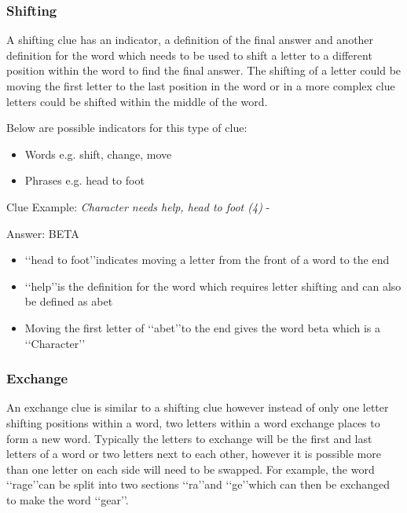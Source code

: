 \subsubsection{Shifting}

A shifting clue has an indicator, a definition of the final answer and another definition for the word which needs to be used to shift a letter to a different position within the word to find the final answer. The shifting of a letter could be moving the first letter to the last position in the word or in a more complex clue letters could be shifted within the middle of the word.  

Below are possible indicators for this type of clue:
\begin{itemize} 
	\item Words e.g. shift, change, move 
	\item Phrases e.g. head to foot 
\\
\end{itemize}

Clue Example: \emph{Character needs help, head to foot (4)}  - \citep{shuchiShifting09} 

Answer: BETA 

\begin{itemize}
	\item \lq\lq head to foot\rq\rq indicates moving a letter from the front of a word to the end 
	\item \lq\lq help\rq\rq is the definition for the word which requires letter shifting and can also be defined as abet 
	\item Moving the first letter of \lq\lq abet\rq\rq to the end gives the word beta which is a \lq\lq Character\rq\rq
\end{itemize}

\subsubsection{Exchange}

An exchange clue is similar to a shifting clue however instead of only one letter shifting positions within a word, two letters within a word exchange places to form a new word. Typically the letters to exchange will be the first and last letters of a word or two letters next to each other, however it is possible more than one letter on each side will need to be swapped. For example, the word \lq\lq rage\rq\rq can be split into two sections \lq\lq ra\rq\rq and \lq\lq ge\rq\rq which can then be exchanged to make the word \lq\lq gear\rq\rq.   

